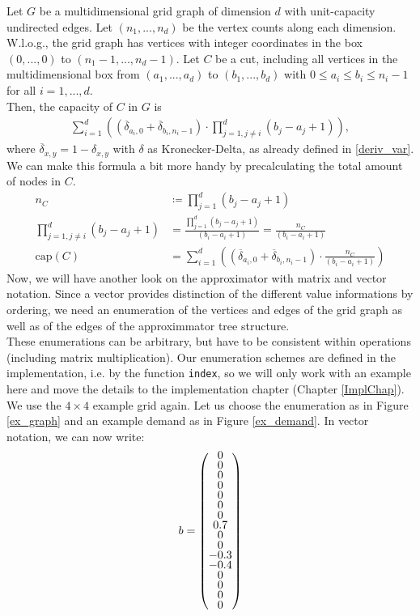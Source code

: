 Let $G$ be a multidimensional grid graph of dimension $d$ with unit-capacity undirected edges. Let $(n_1,...,n_d)$ be the vertex counts along each dimension. W.l.o.g., the grid graph has vertices with integer coordinates in the box $(0,...,0)$ to $(n_1-1,...,n_d-1)$. Let $C$ be a cut, including all vertices in the multidimensional box from $(a_1,...,a_d)$ to $(b_1,...,b_d)$ with $0\leq a_i\leq b_i\leq n_i-1$ for all $i=1,...,d$. \\
Then, the capacity of $C$ in $G$ is
\begin{align}
\sum_{i=1}^d\left((\overline{\delta}_{a_i,0}+\overline{\delta}_{b_i,n_i-1})\cdot \prod_{j=1,j\neq i}^d(b_j-a_j+1)\right),\label{eq_capC}
\end{align}
where $\overline{\delta}_{x,y}=1-\delta_{x,y}$ with $\delta$ as Kronecker-Delta, as already defined in \ref{deriv_var}.
We can make this formula a bit more handy by precalculating the total amount of nodes in $C$.
\begin{align*}
n_C&\coloneqq \prod_{j=1}^d(b_j-a_j+1)\\
\prod_{j=1,j\neq i}^d(b_j-a_j+1)&=\frac{\prod_{j=1}^d(b_j-a_j+1)}{(b_i-a_i+1)}=\frac{n_C}{(b_i-a_i+1)}\\
\text{cap}(C)&=\sum_{i=1}^d\left((\overline{\delta}_{a_i,0}+\overline{\delta}_{b_i,n_i-1})\cdot \frac{n_C}{(b_i-a_i+1)}\right)
\end{align*}
Now, we will have another look on the approximator with matrix and vector notation. Since a vector provides distinction of the different value informations by ordering, we need an enumeration of the vertices and edges of the grid graph as well as of the edges of the approximmator tree structure.\\
These enumerations can be arbitrary, but have to be consistent within operations (including matrix multiplication). Our enumeration schemes are defined in the implementation, i.e. by the function \texttt{index}, so we will only work with an example here and move the details to the implementation chapter (Chapter \ref{ImplChap}).\\
We use the $4\times 4$ example grid again. Let us choose the enumeration as in Figure \ref{ex_graph} and an example demand as in Figure \ref{ex_demand}. In vector notation, we can now write:
\begin{align*}
\begingroup
\renewcommand*{\arraystretch}{0.7}
b=\begin{pmatrix}0\\0\\0\\0\\0\\0\\0\\0.7\\0\\0\\-0.3\\-0.4\\0\\0\\0\\0\end{pmatrix}
\endgroup
\end{align*}
